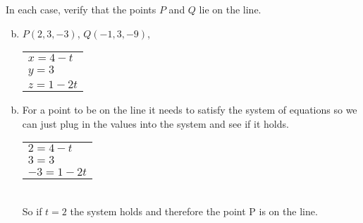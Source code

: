 \documentclass[../main.tex]{subfiles}
\begin{document}
In each case, verify that the points $P$ and $Q$ lie on the line.
\begin{enumerate}[a)]
	\setcounter{enumi}{1}
	\item $P(2, 3, -3)$, $Q(-1, 3, -9)$,
		\begin{tabular}{l}
			$x = 4 - t$ \\
		 	$y = 3$ \\
			$z = 1 - 2t$
		\end{tabular}
\end{enumerate}

\solution
\begin{enumerate}[a)]
	\setcounter{enumi}{1}
	\item For a point to be on the line it needs to satisfy the system of equations so we can just plug in the values into the system and see if it holds. \\
		\begin{tabular}{l}
				$2 = 4 - t$ \\
				$3 = 3$ \\
				$-3 = 1 - 2t$
		\end{tabular} \\
	So if $t = 2$ the system holds and therefore the point P is on the line.
\end{enumerate}
\end{document}
